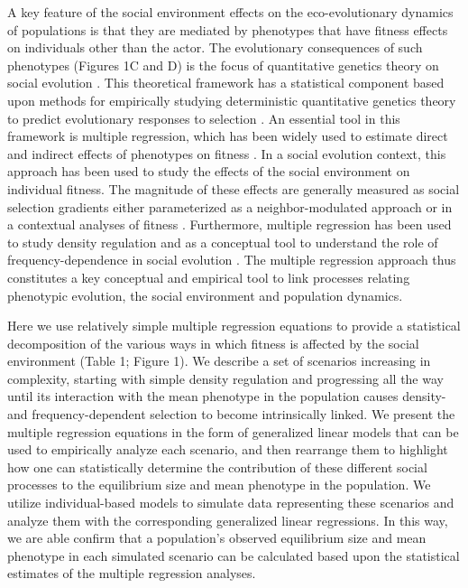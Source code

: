 \documentclass{article}
\begin{document}
	A key feature of the social environment effects on the eco-evolutionary dynamics of populations is that they are mediated by phenotypes that have fitness effects on individuals other than the actor. The evolutionary consequences of such phenotypes (Figures 1C and D) is the focus of quantitative genetics theory on social evolution \citep{frank1998foundations, Araya-Ajoy2020}.  This theoretical framework has a statistical component based upon methods for empirically studying deterministic quantitative genetics theory to predict evolutionary responses to selection \citep{Robertson1966, Lande1976, Lande1979, Lande1983}. An essential tool in this framework is multiple regression, which has been widely used to estimate direct and indirect effects of phenotypes on fitness \citep{Kingsolver2011}. In a social evolution context, this approach has been used to study the effects of the social environment on individual fitness. The magnitude of these effects are generally measured as social selection gradients \citep{Wolf1999SocialSelection} either parameterized as a neighbor-modulated approach \citep{Okasha2006} or in a contextual analyses of fitness \citep{Heisler1987, Goodnight1992}. Furthermore, multiple regression has been used to study density regulation \citep{Araya-Ajoy2021, Saether2021} and as a conceptual tool to understand the role of frequency-dependence in social evolution \citep{Araya-Ajoy2020, Westneat2012a}. The multiple regression approach thus constitutes a key conceptual and empirical tool to link processes relating phenotypic evolution, the social environment and population dynamics. 
	
	Here we use relatively simple multiple regression equations to provide a statistical decomposition of the various ways in which fitness is affected by the social environment (Table 1; Figure 1). We describe a set of scenarios increasing in complexity, starting with simple density regulation and progressing all the way until its interaction with the mean phenotype in the population causes density- and frequency-dependent selection to become intrinsically linked. We present the multiple regression equations in the form of generalized linear models that can be used to empirically analyze each scenario, and then rearrange them to highlight how one can statistically determine the contribution of these different social processes to the equilibrium size and mean phenotype in the population. We utilize individual-based models to simulate data representing these scenarios and analyze them with the corresponding generalized linear regressions. In this way, we are able confirm that a population's observed equilibrium size and mean phenotype in each simulated scenario can be calculated based upon the statistical estimates of the multiple regression analyses. 
	
\end{document}
